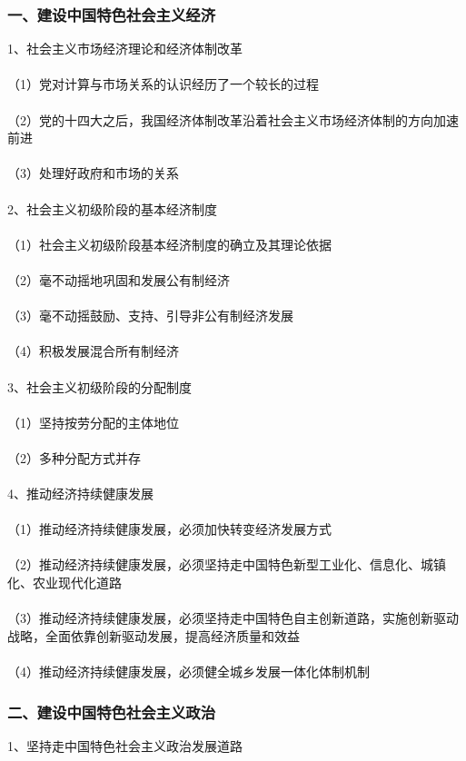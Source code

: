 \documentclass{ctexart}
\begin{document}
\subsubsection{一、建设中国特色社会主义经济}
1、社会主义市场经济理论和经济体制改革
\\\\
（1）党对计算与市场关系的认识经历了一个较长的过程
\\\\
（2）党的十四大之后，我国经济体制改革沿着社会主义市场经济体制的方向加速前进
\\\\
（3）处理好政府和市场的关系
\\\\

2、社会主义初级阶段的基本经济制度
\\\\
（1）社会主义初级阶段基本经济制度的确立及其理论依据
\\\\
（2）毫不动摇地巩固和发展公有制经济
\\\\
（3）毫不动摇鼓励、支持、引导非公有制经济发展
\\\\
（4）积极发展混合所有制经济
\\\\

3、社会主义初级阶段的分配制度
\\\\
（1）坚持按劳分配的主体地位
\\\\
（2）多种分配方式并存
\\\\

4、推动经济持续健康发展
\\\\
（1）推动经济持续健康发展，必须加快转变经济发展方式
\\\\
（2）推动经济持续健康发展，必须坚持走中国特色新型工业化、信息化、城镇化、农业现代化道路
\\\\
（3）推动经济持续健康发展，必须坚持走中国特色自主创新道路，实施创新驱动战略，全面依靠创新驱动发展，提高经济质量和效益
\\\\
（4）推动经济持续健康发展，必须健全城乡发展一体化体制机制

\subsubsection{二、建设中国特色社会主义政治}
1、坚持走中国特色社会主义政治发展道路
\\\\
\end{document}
